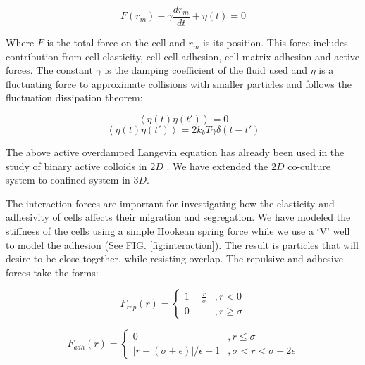 \documentclass[aps,prb,twocolumn,groupedaddress,nofootinbib,floatfix]{revtex4}
\begin{document}
\begin{equation}
F(r _m) - \gamma \frac{dr_m}{dt} + \eta(t) = 0
\end{equation}

Where $F$ is the total force on the cell and $r_m$ is its position.
This force includes contribution from cell elasticity,
cell-cell adhesion, cell-matrix adhesion and active forces.
The constant $\gamma$ is the damping coefficient of the fluid used and $\eta$ is a fluctuating force to approximate collisions with smaller particles and follows the fluctuation dissipation theorem:

\begin{equation}
\left\langle \eta(t)\eta(t')\right\rangle = 0 
\end{equation}
\begin{equation}
\left\langle \eta(t)\eta(t')\right\rangle = 2k_bT\gamma
\delta(t-t')
\end{equation}

The above active overdamped Langevin equation \cite{RednerBaskaran,FilyMarchetti} has already been used in the study of binary active colloids in $2D$ \cite{Butcher}. 
We have extended the $2D$ co-culture system to confined system in $3D$.


The interaction forces are important for investigating how the elasticity and adhesivity of cells affects their migration and segregation. We have modeled the stiffness of the cells using a simple Hookean spring force while we use a `V' well to model the adhesion (See FIG. \ref{fig:interaction}). The result is particles that will desire to be close together, while resisting overlap. The repulsive and adhesive forces take the forms:

\begin{equation}
  F_{rep}(r) = \left\{
    \begin{array}{lr}
      1-\frac{r}{\sigma} &, r < 0\\
      0 &, r \ge \sigma
    \end{array}
  \right.
  \label{eq:frep}
\end{equation}

\begin{equation}
  F_{adh}(r) = \left\{
    \begin{array}{lr}
      0 &, r \le \sigma \\
      |r - (\sigma+\epsilon)|/\epsilon-1 &, \sigma < r < \sigma+2\epsilon
    \end{array}
  \right.
  \label{eq:fadh}
\end{equation}
\end{document}
